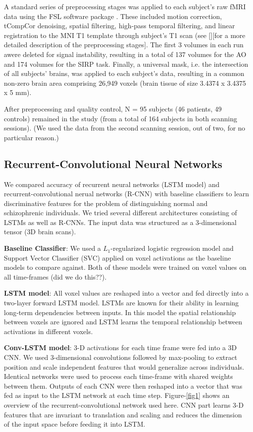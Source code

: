 \documentclass{article}
\begin{document}
A standard series of preprocessing stages was applied to each subject's raw fMRI data using the FSL software package \citep{Jenkinson2012}. These included motion correction, tCompCor denoising, spatial filtering, high-pass temporal filtering, and linear registration to the MNI T1 template through subject's T1 scan (see \citep[see]{Gheiratmand2017}[][for a more detailed description of the preprocessing stages]. The first 3 volumes in each run awere deleted for signal instability, resulting in a total of 137 volumes for the AO and 174 volumes for the SIRP task. Finally, a universal mask, i.e. the intersection of all subjects' brains, was applied to each subject's data, resulting in a common non-zero brain area comprising 26,949 voxels (brain tissue of size 3.4374 x 3.4375 x 5 mm).

After preprocessing and quality control, N = 95 subjects (46 patients, 49 controls) remained in the study (from a total of 164 subjects in both scanning sessions). (We used the data from the second scanning session, out of two, for no particular reason.)

\subsection{Recurrent-Convolutional Neural Networks}

We compared accuracy of recurrent neural networks (LSTM model) and recurrent-convolutional nerual networks (R-CNN) with baseline classifiers to learn discriminative features for the problem of distinguishing normal and schizophrenic individuals. We tried several different architectures consisting of LSTMs as well as R-CNNs. The input data was structured as a 3-dimensional tensor (3D brain scans). 

\textbf{Baseline Classifier}: We used a $L_1$-regularized logistic regression model and Support Vector Classifier (SVC) applied on voxel activations as the baseline models to compare against. Both of these models were trained on voxel values on all time-frames (did we do this??). 

\textbf{LSTM model}: All voxel values are reshaped into a vector and fed directly into a two-layer forward LSTM model. LSTMs are known for their ability in learning long-term dependencies between inputs. In this model the spatial relationship between voxels are ignored and LSTM learns the temporal relationship between activations in different voxels. 

\textbf{Conv-LSTM model}: 3-D activations for each time frame were fed into a 3D CNN. We used 3-dimensional convolutions followed by max-pooling to extract position and scale independent features that would generalize across individuals. Identical networks were used to process each time-frame with shared weights between them. Outputs of each CNN were then reshaped into a vector that was fed as input to the LSTM network at each time step. Figure-\ref{fig1} shows an overview of the recurrent-convolutional network used here. CNN part learns 3-D features that are invariant to translation and scaling and reduces the dimension of the input space before feeding it into LSTM. 
\end{document}
